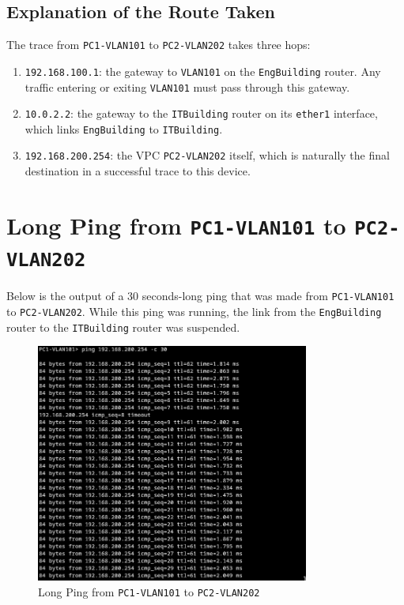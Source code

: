 \documentclass[a4paper]{article}
\begin{document}
\subsection{Explanation of the Route Taken}
The trace from \verb|PC1-VLAN101| to \verb|PC2-VLAN202| takes three hops:
\begin{enumerate}
    \item   \verb|192.168.100.1|: the gateway to \verb|VLAN101| on the \verb|EngBuilding| router.
            Any traffic entering or exiting \verb|VLAN101| must pass through this gateway.

    \item   \verb|10.0.2.2|: the gateway to the \verb|ITBuilding| router on its \verb|ether1| interface, which links 
            \verb|EngBuilding| to \verb|ITBuilding|.

    \item   \verb|192.168.200.254|: the VPC \verb|PC2-VLAN202| itself, which is naturally the final destination in a 
            successful trace to this device.
\end{enumerate}

\section{Long Ping from \texttt{PC1-VLAN101} to \texttt{PC2-VLAN202}}
Below is the output of a 30 seconds-long ping that was made from \verb|PC1-VLAN101| to \verb|PC2-VLAN202|. 
While this ping was running, the link from the \verb|EngBuilding| router to the \verb|ITBuilding| router was suspended.
\begin{figure}[H]
    \centering
    \includegraphics[width=0.8\textwidth]{./images/long_ping.png}
    \caption{Long Ping from \texttt{PC1-VLAN101} to \texttt{PC2-VLAN202}}
\end{figure}
\end{document}
